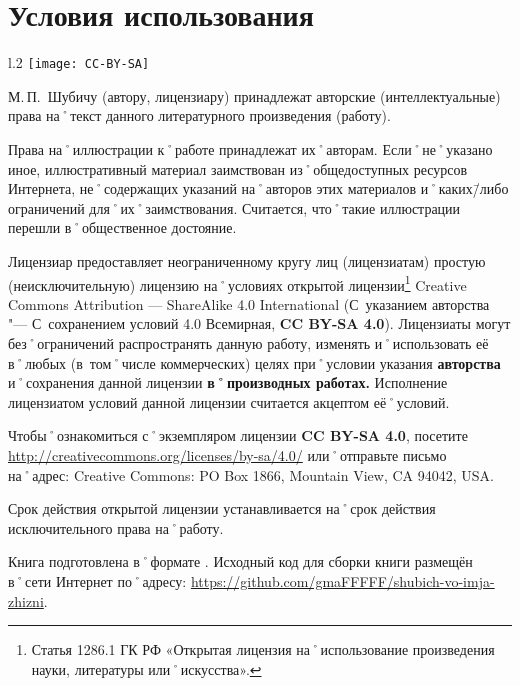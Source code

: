 ﻿%
\chapter{Условия использования}

\begin{wrapfigure}{l}{.2\textwidth}
\centering
\texttt{[image: CC-BY-SA]}
\label{fig:CC-BY-SA}
\end{wrapfigure}

\noindent М.\,П.~Шубичу (автору, лицензиару) принадлежат авторские (интеллектуальные) права на˚текст данного литературного произведения (работу). 

\noindent Права на˚иллюстрации к˚работе принадлежат их˚авторам. Если˚не˚указано иное, иллюстративный материал заимствован из˚общедоступных ресурсов Интернета, не˚содержащих указаний на˚авторов этих материалов и˚каких\=/либо ограничений для˚их˚заимствования. Считается, что˚такие иллюстрации перешли в˚общественное достояние.

Лицензиар предоставляет неограниченному кругу лиц (лицензиатам) простую (неисключительную) лицензию на˚условиях открытой лицензии\footnote
{Статья 1286.1 ГК РФ «Открытая лицензия на˚использование произведения науки, литературы или˚искусства».}
\foreignlanguage{english}{Creative Commons Attribution --- ShareAlike 4.0 International} (С~указанием авторства "--- С~сохранением условий 4.0 Всемирная, \textbf{CC BY-SA 4.0}). Лицензиаты могут без˚ограничений распространять данную работу, изменять и˚использовать её в˚любых (в~том˚числе коммерческих) целях при˚условии указания \textbf{авторства} и˚сохранения данной лицензии \textbf{в˚производных работах.}
Исполнение лицензиатом условий данной лицензии считается акцептом её˚условий.

Чтобы˚ознакомиться с˚экземпляром лицензии \textbf{CC BY-SA 4.0}, посетите \url{http://creativecommons.org/licenses/by-sa/4.0/} или˚отправьте письмо на˚адрес: \foreignlanguage{english}{Creative Commons: PO Box 1866, Mountain View, CA 94042, USA.}{\sloppy

}%

Срок действия открытой лицензии устанавливается на˚срок действия исключительного права на˚работу.

Книга подготовлена в˚формате \LaTeXe{}. Исходный код для сборки книги размещён в˚сети Интернет по˚адресу: \url{https://github.com/gmaFFFFF/shubich-vo-imja-zhizni}.{\sloppy

}


